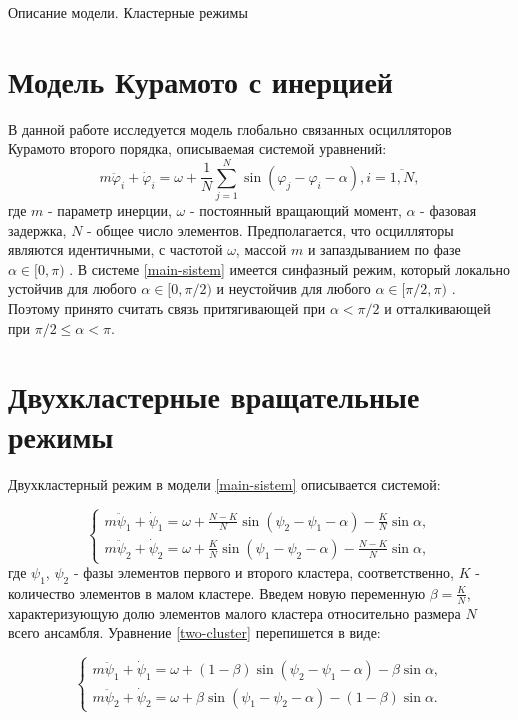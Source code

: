 \begin{chapter}{Описание модели. Кластерные режимы}
	\section{Модель Курамото с инерцией}
	В данной работе исследуется модель глобально связанных осцилляторов Курамото второго порядка, описываемая системой уравнений:
	\begin{equation} \label{main-sistem}
		m\ddot{\varphi}_i + \dot{\varphi}_i = \omega + 
		\frac{1}{N} \sum_{j = 1}^N \sin{(\varphi_j - 
		\varphi_i - \alpha)}, i = \overline{1, N}, 
	\end{equation}
	где $m$ - параметр инерции, $\omega$ - постоянный вращающий момент,
	$\alpha$ - фазовая задержка, $N$ - общее число элементов.
	Предполагается, что осцилляторы являются идентичными, с частотой $\omega$, массой $m$ и запаздыванием по
	фазе $\alpha \in [0, \pi)$ \cite{Sakaguchi} . В системе \eqref{main-sistem} имеется синфазный режим,
	который локально устойчив для любого $\alpha \in [0, \pi/2)$
	и неустойчив для любого $\alpha \in [\pi/2, \pi)$ \cite{Acebron:Bonilla}. Поэтому принято считать связь притягивающей при
	$\alpha < \pi/2$ и отталкивающей при $\pi/2 \leq \alpha < \pi$.

	\section{Двухкластерные вращательные режимы}
	
	Двухкластерный режим в модели \eqref{main-sistem} описывается системой:
	
	\begin{equation} \label{two-cluster}
		\begin{cases}
			m\ddot{\psi}_1 + \dot{\psi}_1 = \omega + \frac{N-K}{N} \sin{(\psi_2 - \psi_1 - \alpha)} - \frac{K}{N}\sin{\alpha},\\
			m\ddot{\psi}_2 + \dot{\psi}_2 = \omega + \frac{K}{N} \sin{(\psi_1 - \psi_2 - \alpha)} - \frac{N - K}{N}\sin{\alpha},
		\end{cases}
	\end{equation}
	где $\psi_1$, $\psi_2$ - фазы элементов первого и
	второго кластера, соответственно, $K$ - количество элементов в малом кластере.
	Введем новую переменную $\beta = \frac{K}{N}$, характеризующую долю элементов малого кластера относительно размера $N$ всего ансамбля.
	Уравнение \eqref{two-cluster} перепишется в виде:
	
	\begin{equation} \label{two-cluster-beta}
		\begin{cases}
			m\ddot{\psi}_1 + \dot{\psi}_1 = \omega + (1 - \beta) \sin{(\psi_2 - \psi_1 - \alpha)} - \beta\sin{\alpha}, \\
			m\ddot{\psi}_2 + \dot{\psi}_2 = \omega + \beta \sin{(\psi_1 - \psi_2 - \alpha)} - (1 - \beta)\sin{\alpha}.
		\end{cases}
	\end{equation}
	

\end{chapter}
